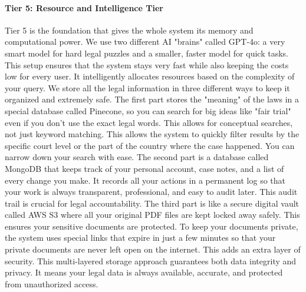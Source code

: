 \documentclass[a4paper,fleqn]{cas-dc}
\begin{document}
\paragraph{\textbf{Tier 5: Resource and Intelligence Tier}}
Tier 5 is the foundation that gives the whole system its memory and computational power. We use two different AI "brains" called GPT-4o: a very smart model for hard legal puzzles and a smaller, faster model for quick tasks. This setup ensures that the system stays very fast while also keeping the costs low for every user. It intelligently allocates resources based on the complexity of your query. We store all the legal information in three different ways to keep it organized and extremely safe. The first part stores the "meaning" of the laws in a special database called Pinecone, so you can search for big ideas like "fair trial" even if you don't use the exact legal words. This allows for conceptual searches, not just keyword matching. This allows the system to quickly filter results by the specific court level or the part of the country where the case happened. You can narrow down your search with ease. The second part is a database called MongoDB that keeps track of your personal account, case notes, and a list of every change you make. It records all your actions in a permanent log so that your work is always transparent, professional, and easy to audit later. This audit trail is crucial for legal accountability. The third part is like a secure digital vault called AWS S3 where all your original PDF files are kept locked away safely. This ensures your sensitive documents are protected. To keep your documents private, the system uses special links that expire in just a few minutes so that your private documents are never left open on the internet. This adds an extra layer of security. This multi-layered storage approach guarantees both data integrity and privacy. It means your legal data is always available, accurate, and protected from unauthorized access.

\FloatBarrier
\end{document}

